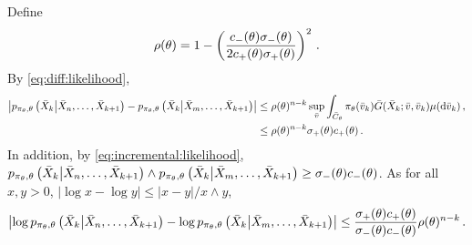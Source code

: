 Define 
\[
\rho(\theta) = 1- \left(\frac{c_-(\theta)\sigma_-(\theta)}{2c_+(\theta)\sigma_+(\theta)}\right)^2\,.
\]
By \eqref{eq:diff:likelihood},
\begin{align*}
\left|p_{\pi_{\theta},\theta}\left(\bar X_{k}\middle| \bar X_{n},\ldots,\bar X_{k+1}\right) - p_{\pi_{\theta},\theta}\left(\bar X_{k}\middle| \bar X_{m},\ldots,\bar X_{k+1}\right)\right| &\le \rho(\theta) ^{n-k} \sup_{\bar v} \int_{\bar C_{\theta}}\pi_{\theta}(\bar v_{k})\bar G(\bar X_{k};\bar v,\bar v_{k})\mu(\mathrm{d} \bar v_{k})\,,\\
&\le \rho(\theta)^{n-k}\sigma_+(\theta)c_+(\theta)\,.
\end{align*}
In addition, by \eqref{eq:incremental:likelihood}, $p_{\pi_{\theta},\theta}\left(\bar X_{k}\middle| \bar X_{n},\ldots,\bar X_{k+1}\right)\wedge p_{\pi_{\theta},\theta}\left(\bar X_{k}\middle| \bar X_{m},\ldots,\bar X_{k+1}\right)\ge \sigma_-(\theta)c_-(\theta)$. As for all $x,y>0$, $|\log x - \log y| \le |x-y|/x\wedge y$,
\[
\left|\log p_{\pi_{\theta},\theta}\left(\bar X_{k}\middle| \bar X_{n},\ldots,\bar X_{k+1}\right) - \log p_{\pi_{\theta},\theta}\left(\bar X_{k}\middle| \bar X_{m},\ldots,\bar X_{k+1}\right)\right| \le \frac{\sigma_+(\theta)c_+(\theta)}{\sigma_-(\theta)c_-(\theta)}\rho(\theta)^{n-k}\,.
\]
